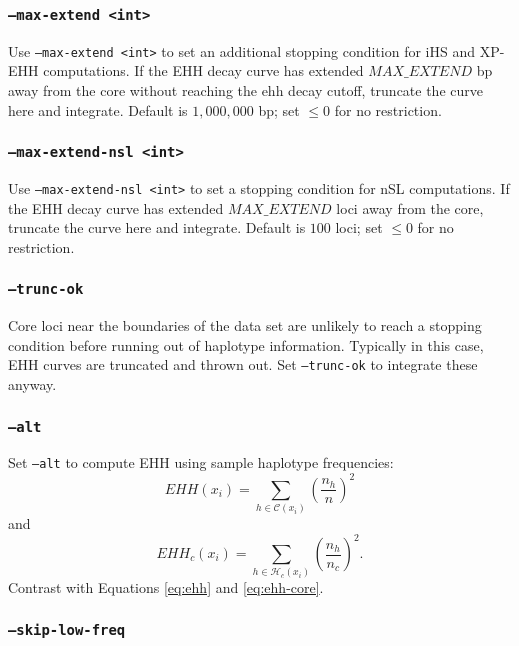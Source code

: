 \documentclass[12pt]{article}%
\begin{document}
\subsubsection{{\tt --max-extend <int>}}

Use {\tt --max-extend <int>} to set an additional stopping condition for iHS and XP-EHH computations.  If the EHH decay curve has extended $MAX\_EXTEND$ bp away from the core without reaching the ehh decay cutoff, truncate the curve here and integrate.  Default is $1,000,000$ bp; set $\le 0$ for no restriction.

\subsubsection{{\tt --max-extend-nsl <int>}}

Use {\tt --max-extend-nsl <int>} to set a stopping condition for nSL computations.  If the EHH decay curve has extended $MAX\_EXTEND$ loci away from the core, truncate the curve here and integrate.  Default is $100$ loci; set $\le 0$ for no restriction.

\subsubsection{{\tt --trunc-ok}}

Core loci near the boundaries of the data set are unlikely to reach a stopping condition before running out of haplotype information.  Typically in this case, EHH curves are truncated and thrown out. Set {\tt --trunc-ok} to integrate these anyway.

\subsubsection{{\tt --alt}}

Set {\tt --alt} to compute EHH using sample haplotype frequencies:
\begin{equation}
EHH(x_i) = \sum_{h \in \mathcal{C}(x_i)} \left(\frac{n_h}{n}\right)^2
\end{equation}
and
\begin{equation}
EHH_c(x_i) = \sum_{h \in \mathcal{H}_c(x_i)} \left(\frac{n_h}{n_c}\right)^2.
\end{equation}
Contrast with Equations \ref{eq:ehh} and \ref{eq:ehh-core}.

\subsubsection{{\tt --skip-low-freq}}
\end{document}
